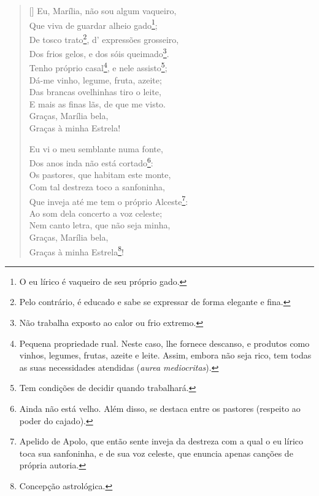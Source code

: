 \documentclass[12pt]{book}
\begin{document}
				\begin{verse}[\versewidth]
					Eu, Marília, não sou algum vaqueiro, \\
					Que viva de guardar alheio gado\footnote{O eu lírico é vaqueiro de seu próprio gado.}; \\
					De tosco trato\footnote{Pelo contrário, é educado e sabe se expressar de forma elegante e fina.}, d’ expressões grosseiro, \\
					Dos frios gelos, e dos sóis queimado\footnote{Não trabalha exposto ao calor ou frio extremo.}. \\
					Tenho próprio casal\footnote{Pequena propriedade rual. Neste caso, lhe fornece descanso, e produtos como vinhos, legumes, frutas, azeite e leite. Assim, embora não seja rico, tem todas as suas necessidades atendidas (\textit{aurea mediocritas}).}, e nele assisto\footnote{Tem condições de decidir quando trabalhará.}; \\
					Dá-me vinho, legume, fruta, azeite; \\
					Das brancas ovelhinhas tiro o leite, \\
					E mais as finas lãs, de que me visto. \\
					\hspace{2em} Graças, Marília bela, \\
					\hspace{2em} Graças à minha Estrela!
					
					Eu vi o meu semblante numa fonte, \\
					Dos anos inda não está cortado\footnote{Ainda não está velho. Além disso, se destaca entre os pastores (respeito ao poder do cajado).}: \\
					Os pastores, que habitam este monte, \\
					Com tal destreza toco a sanfoninha, \\
					Que inveja até me tem o próprio Alceste\footnote{Apelido de Apolo, que então sente inveja da destreza com a qual o eu lírico toca sua sanfoninha, e de sua voz celeste, que enuncia apenas canções de própria autoria.}: \\
					Ao som dela concerto a voz celeste; \\
					Nem canto letra, que não seja minha, \\
					\hspace{2em} Graças, Marília bela, \\
					\hspace{2em} Graças à minha Estrela\footnote{Concepção astrológica.}!
					

\end{verse}
\end{document}
